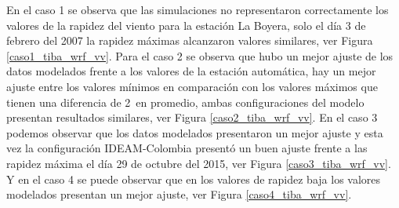 En el caso 1 se observa que las simulaciones no representaron correctamente los valores de la rapidez del viento para la estación La Boyera, solo el día 3 de febrero del 2007 la rapidez máximas alcanzaron valores similares, ver Figura \ref{caso1_tiba_wrf_vv}. Para el caso 2 se observa que hubo un mejor ajuste de los datos modelados frente a los valores de la estación automática, hay un mejor ajuste entre los valores mínimos en comparación con los valores máximos que tienen una diferencia de 2\celsius\ en promedio, ambas configuraciones del modelo presentan resultados similares, ver Figura \ref{caso2_tiba_wrf_vv}. En el caso 3 podemos observar que los datos modelados presentaron un mejor ajuste y esta vez la configuración IDEAM-Colombia presentó un buen ajuste frente a las rapidez máxima el día 29 de octubre del 2015, ver Figura \ref{caso3_tiba_wrf_vv}. Y en el caso 4 se puede observar que en los valores de rapidez baja los valores modelados presentan un mejor ajuste, ver Figura \ref{caso4_tiba_wrf_vv}.\\


